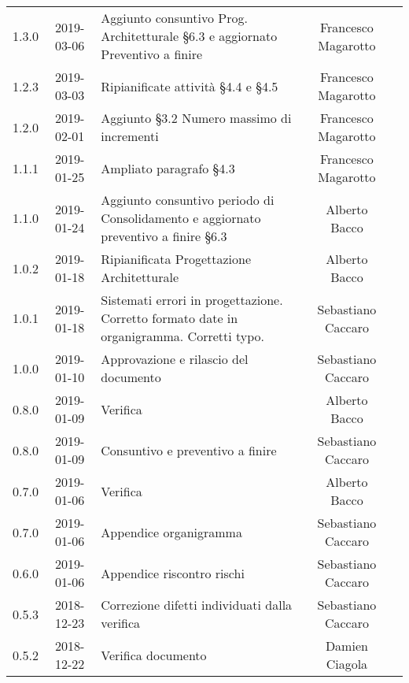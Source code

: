 {\begin{longtable}{ c c  C{4cm}  c  c }
		1.3.0 & 2019-03-06 & Aggiunto consuntivo Prog. Architetturale §6.3 e aggiornato Preventivo a finire & Francesco Magarotto & \reda{}\\

		1.2.3 & 2019-03-03 & Ripianificate attività §4.4 e §4.5 & Francesco Magarotto & \reda{}\\

		1.2.0 & 2019-02-01 & Aggiunto §3.2 Numero massimo di incrementi & Francesco Magarotto & \reda{}\\

		1.1.1 & 2019-01-25 & Ampliato paragrafo §4.3 & Francesco Magarotto & \reda{}\\

		1.1.0 & 2019-01-24 & Aggiunto consuntivo periodo di Consolidamento  e aggiornato preventivo a finire §6.3 & Alberto Bacco & \reda{}\\

		1.0.2 & 2019-01-18 & Ripianificata Progettazione Architetturale & Alberto Bacco & \Res{} \\

		1.0.1 & 2019-01-18 & Sistemati errori in progettazione. Corretto formato date in organigramma. Corretti typo. & Sebastiano Caccaro & \reda{}\\

		1.0.0 & 2019-01-10 & Approvazione e rilascio del documento & Sebastiano Caccaro & \Res{}\\

		0.8.0 & 2019-01-09 & Verifica & Alberto Bacco & \ver{}\\
		
		0.8.0 & 2019-01-09 & Consuntivo e preventivo a finire & Sebastiano Caccaro & \reda{}\\			
		
		0.7.0 & 2019-01-06 & Verifica & Alberto Bacco & \ver{}\\		
		
		0.7.0 & 2019-01-06 & Appendice organigramma & Sebastiano Caccaro & \reda{}\\		
		
		0.6.0 & 2019-01-06 & Appendice riscontro rischi & Sebastiano Caccaro & \reda{}\\
					
		0.5.3 & 2018-12-23 & Correzione difetti individuati dalla verifica & Sebastiano Caccaro & \reda{}\\		
		
		0.5.2 & 2018-12-22 & Verifica documento & Damien Ciagola & \ver{}\\
		

\end{longtable}}
